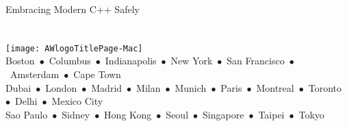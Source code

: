 \thispagestyle{empty}
\begin{center}
{\sfititle Embracing Modern C++ Safely}\\
\vspace*{54pt}
\vspace*{\fill}    %
\\[3ex]
\\        %

\vspace*{\fill}    %
\texttt{[image: AWlogoTitlePage-Mac]}\\   %
{\footnotesize 
Boston~$\bullet$~Columbus~$\bullet$~Indianapolis~$\bullet$~New York~$\bullet$~San Francisco~$\bullet$~Amsterdam~$\bullet$~Cape Town\\[1ex]
Dubai~$\bullet$~London~$\bullet$~Madrid~$\bullet$~Milan~$\bullet$~Munich~$\bullet$~Paris~$\bullet$~Montreal~$\bullet$~Toronto~$\bullet$~Delhi~$\bullet$~Mexico City\\[1ex]
Sao Paulo~$\bullet$~Sidney~$\bullet$~Hong Kong~$\bullet$~Seoul~$\bullet$~Singapore~$\bullet$~Taipei~$\bullet$~Tokyo\\[1ex]
}
\end{center}